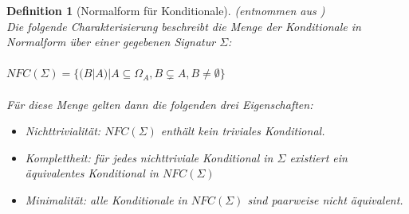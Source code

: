\documentclass[12pt,a4paper]{article}
\newtheorem{theorem}{Definition}
\begin{document}
\begin{theorem}[Normalform für Konditionale](entnommen aus \cite{beierle19})\\
Die folgende Charakterisierung beschreibt die Menge der Konditionale in Normalform über einer gegebenen Signatur $\Sigma$: \\ \\
$NFC(\Sigma) = \{(B|A)|A \subseteq \Omega_A, B \subsetneq A, B \neq \emptyset \}$ \\ \\
Für diese Menge gelten dann die folgenden drei Eigenschaften:\
 \begin{itemize}
\item{Nichttrivialität: $NFC(\Sigma)$ enthält kein triviales Konditional.}
\item{Komplettheit: für jedes nichttriviale Konditional in $\Sigma$ existiert ein äquivalentes Konditional in $NFC(\Sigma)$ }
\item{Minimalität: alle Konditionale in $NFC(\Sigma)$ sind paarweise nicht äquivalent.}
\end{itemize}
\label{normal-form}
\end{theorem}
\end{document}
